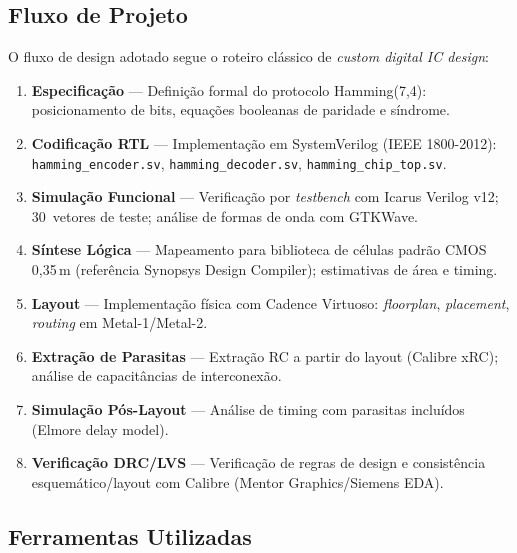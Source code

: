 \documentclass[12pt,a4paper]{article}
\begin{document}
\subsection{Fluxo de Projeto}

O fluxo de design adotado segue o roteiro clássico de \textit{custom digital IC design}:

\begin{enumerate}[leftmargin=2em,label=\textbf{F\arabic*.}]
  \item \textbf{Especificação} --- Definição formal do protocolo Hamming(7,4): posicionamento de bits, equações booleanas de paridade e síndrome.
  \item \textbf{Codificação RTL} --- Implementação em SystemVerilog (IEEE 1800-2012): \texttt{hamming\_encoder.sv}, \texttt{hamming\_decoder.sv}, \texttt{hamming\_chip\_top.sv}.
  \item \textbf{Simulação Funcional} --- Verificação por \textit{testbench} com Icarus Verilog v12; 30~vetores de teste; análise de formas de onda com GTKWave.
  \item \textbf{Síntese Lógica} --- Mapeamento para biblioteca de células padrão CMOS 0,35\,\textmu m (referência Synopsys Design Compiler); estimativas de área e timing.
  \item \textbf{Layout} --- Implementação física com Cadence Virtuoso: \textit{floorplan}, \textit{placement}, \textit{routing} em Metal-1/Metal-2.
  \item \textbf{Extração de Parasitas} --- Extração RC a partir do layout (Calibre xRC); análise de capacitâncias de interconexão.
  \item \textbf{Simulação Pós-Layout} --- Análise de timing com parasitas incluídos (Elmore delay model).
  \item \textbf{Verificação DRC/LVS} --- Verificação de regras de design e consistência esquemático/layout com Calibre (Mentor Graphics/Siemens EDA).
\end{enumerate}

\subsection{Ferramentas Utilizadas}
\end{document}
